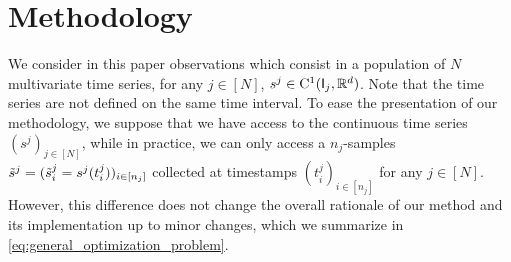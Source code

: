     

\section{Methodology}

We consider in this paper observations which consist in a population of $N$ multivariate time series, for any $j\in[N]$, $s^j \in \mathrm{C}^1(\mathsf{I}_j,\mathbb{R}^{d})$. 
 Note that the time series are not defined on the same time interval.
To ease the presentation of our methodology, we suppose that we have access to the continuous time series $(s^j)_{j\in[N]}$, while in practice, we can only access a $n_j$-samples $\tilde{s}^j=(\tilde{s}_i^j=s^j(t^j_i))_{i\in[n_j]}$ collected at timestamps $(t^j_i)_{i\in[n_j]}$ for any $j \in [N]$.
 However, this difference does not change the overall rationale of our method and its implementation up to minor changes, which we summarize in \eqref{eq:general_optimization_problem}.

